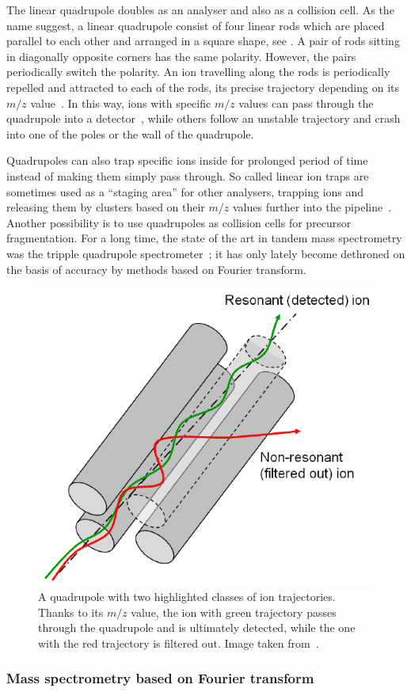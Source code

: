 The linear quadrupole doubles as an analyser and also as a collision cell. As the name suggest, a linear quadrupole consist of four linear rods which are placed parallel to each other and arranged in a square shape, see . A pair of rods sitting in diagonally opposite corners has the same polarity. However, the pairs periodically switch the polarity. An ion travelling along the rods is periodically repelled and attracted to each of the rods, its precise trajectory depending on its \(m/z\) value~\cite{paul1990electromagnetic}. In this way, ions with specific \(m/z\) values can pass through the quadrupole into a detector~\cite{paul1953neues}, while others follow an unstable trajectory and crash into one of the poles or the wall of the quadrupole.

Quadrupoles can also trap specific ions inside for prolonged period of time instead of making them simply pass through. So called linear ion traps are sometimes used as a ``staging area'' for other analysers, trapping ions and releasing them by clusters based on their \(m/z\) values further into the pipeline~\cite{mao2003h}. Another possibility is to use quadrupoles as collision cells for precursor fragmentation. For a long time, the state of the art in tandem mass spectrometry was the tripple quadrupole spectrometer~\cite{yost1978selected}; it has only lately become dethroned on the basis of accuracy by methods based on Fourier transform.

\begin{figure}
  \centering
  \includegraphics[width=.4\linewidth]{img/quadrupole.png}
  \caption{A quadrupole with two highlighted classes of ion trajectories. Thanks to its \(m/z\) value, the ion with green trajectory passes through the quadrupole and is ultimately detected, while the one with the red trajectory is filtered out. Image taken from~\citet{2021Mass}.}\label{fig:quadrupole}
\end{figure}

\subsubsection{Mass spectrometry based on Fourier transform}

